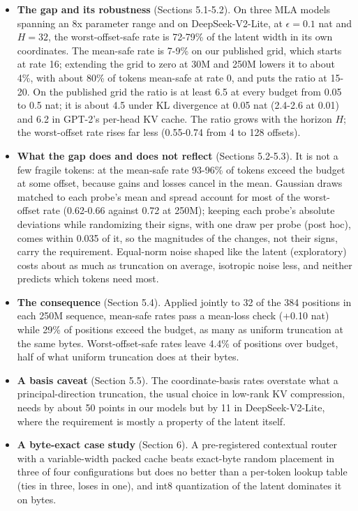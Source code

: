 \documentclass[10pt]{article}
\begin{document}
\begin{itemize}

\item \textbf{The gap and its robustness} (Sections 5.1-5.2). On three MLA models spanning an 8x parameter range and on DeepSeek-V2-Lite, at $\epsilon=0.1$ nat and $H=32$, the worst-offset-safe rate is 72-79\% of the latent width in its own coordinates. The mean-safe rate is 7-9\% on our published grid, which starts at rate 16; extending the grid to zero at 30M and 250M lowers it to about 4\%, with about 80\% of tokens mean-safe at rate 0, and puts the ratio at 15-20. On the published grid the ratio is at least 6.5 at every budget from 0.05 to 0.5 nat; it is about 4.5 under KL divergence at 0.05 nat (2.4-2.6 at 0.01) and 6.2 in GPT-2's per-head KV cache. The ratio grows with the horizon $H$; the worst-offset rate rises far less (0.55-0.74 from 4 to 128 offsets).

\item \textbf{What the gap does and does not reflect} (Sections 5.2-5.3). It is not a few fragile tokens: at the mean-safe rate 93-96\% of tokens exceed the budget at some offset, because gains and losses cancel in the mean. Gaussian draws matched to each probe's mean and spread account for most of the worst-offset rate (0.62-0.66 against 0.72 at 250M); keeping each probe's absolute deviations while randomizing their signs, with one draw per probe (post hoc), comes within 0.035 of it, so the magnitudes of the changes, not their signs, carry the requirement. Equal-norm noise shaped like the latent (exploratory) costs about as much as truncation on average, isotropic noise less, and neither predicts which tokens need most.

\item \textbf{The consequence} (Section 5.4). Applied jointly to 32 of the 384 positions in each 250M sequence, mean-safe rates pass a mean-loss check (+0.10 nat) while 29\% of positions exceed the budget, as many as uniform truncation at the same bytes. Worst-offset-safe rates leave 4.4\% of positions over budget, half of what uniform truncation does at their bytes.

\item \textbf{A basis caveat} (Section 5.5). The coordinate-basis rates overstate what a principal-direction truncation, the usual choice in low-rank KV compression, needs by about 50 points in our models but by 11 in DeepSeek-V2-Lite, where the requirement is mostly a property of the latent itself.

\item \textbf{A byte-exact case study} (Section 6). A pre-registered contextual router with a variable-width packed cache beats exact-byte random placement in three of four configurations but does no better than a per-token lookup table (ties in three, loses in one), and int8 quantization of the latent dominates it on bytes.

\end{itemize}
\end{document}
